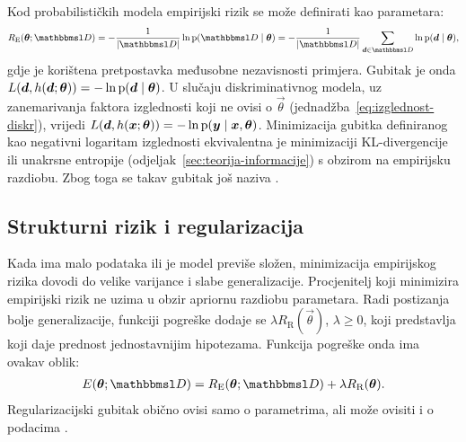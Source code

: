 \documentclass[utf8, diplomski, lmodern]{fer}
\begin{document}
Kod probabilističkih modela empirijski rizik se može definirati kao  parametara:
\begin{align}
R_\text{E}(\vec\theta;\set D) 
= -\frac{1}{\envert{\set D}}\ln\p(\set{D}\mid\vec\theta) 
= -\frac{1}{\envert{\set D}}\sum_{\vec d\in\set{D}} \ln\p(\vec d\mid\vec\theta) \text{,}
\end{align}
gdje je korištena pretpostavka međusobne nezavisnosti primjera. Gubitak je onda $L(\vec d,h(\vec d;\vec\theta)) = -\ln\p(\vec d\mid\vec\theta)$. U slučaju diskriminativnog modela, uz zanemarivanja faktora izglednosti koji ne ovisi o $\vec\theta$ (jednadžba~\eqref{eq:izglednost-diskr}), vrijedi $L(\vec d,h(\vec x;\vec\theta)) = -\ln\p(\vec y\mid\vec x,\vec\theta)$. Minimizacija gubitka definiranog kao negativni logaritam izglednosti ekvivalentna je minimizaciji KL-divergencije ili unakrsne entropije (odjeljak~\ref{sec:teorija-informacije}) s obzirom na empirijsku razdiobu. Zbog toga se takav gubitak još naziva .

\subsection{Strukturni rizik i regularizacija}

Kada ima malo podataka ili je model previše složen, minimizacija empirijskog rizika dovodi do velike varijance i slabe generalizacije. Procjenitelj koji minimizira empirijski rizik ne uzima u obzir apriornu razdiobu parametara. Radi postizanja bolje generalizacije, funkciji pogreške dodaje se  $\lambda R_\text{R}(\vec\theta)$, $\lambda\geq0$, koji predstavlja  koji daje prednost jednostavnijim hipotezama. Funkcija pogreške onda ima ovakav oblik:
\begin{align}
E(\vec\theta;\set{D}) = R_\text{E}(\vec\theta;\set{D}) + \lambda R_\text{R}(\vec\theta) \text{.}
\end{align}
Regularizacijski gubitak obično ovisi samo o parametrima, ali može ovisiti i o podacima \citep{Goodfellow:2016:DL}. 
\end{document}
